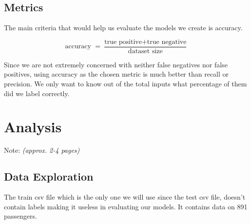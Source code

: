 \documentclass{article}
\begin{document}
\subsection{Metrics}\label{metrics}

The main criteria that would help us evaluate the models we create is
accuracy.

\[ 
  \text{accuracy $=\frac{\text{true positive} + \text{true negative}}{\text{dataset size}}$}
\]

Since we are not extremely concerned with neither false negatives nor false positives,
using accuracy as the chosen metric is much better than recall or precision.
We only want to know out of the total inputs what percentage of them did we label correctly.

\section{Analysis}

Note: \emph{(approx. 2-4 pages)}

\subsection{Data Exploration}\label{data-exploration}

The train csv file which is the only one we will use since the test csv file, doesn't
contain labels making it useless in evaluating our models. It contains data on 891
passengers.
\end{document}

